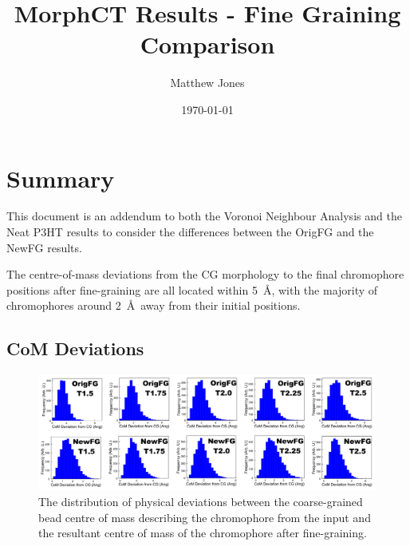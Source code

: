 \documentclass[12pt]{article}
\title{MorphCT Results - Fine Graining Comparison}
\author{Matthew Jones}
\date{\today}
\begin{document}
\maketitle

\section{Summary}

This document is an addendum to both the Voronoi Neighbour Analysis and the Neat P3HT results to consider the differences between the OrigFG and the NewFG results.

The centre-of-mass deviations from the CG morphology to the final chromophore positions after fine-graining are all located within 5~\AA, with the majority of chromophores around 2~\AA~away from their initial positions.

\subsection{CoM Deviations}

\begin{figure}[h!]\centering
	\includegraphics[width=\textwidth]{Figures/CoMDeviation.pdf}
    \caption{The distribution of physical deviations between the coarse-grained bead centre of mass describing the chromophore from the input and the resultant centre of mass of the chromophore after fine-graining.}
	\label{fig:Deviation}
\end{figure}



\end{document}

